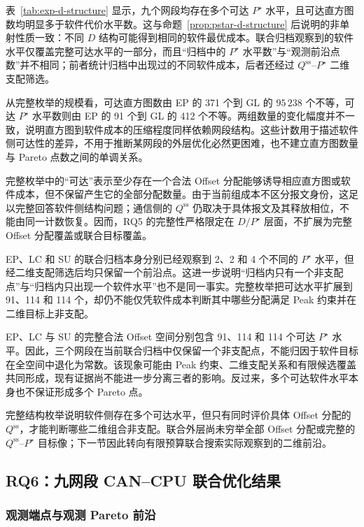 \documentclass[UTF8,a4paper,twoside,zihao=-4]{ctexart}
\numberwithin{equation}{section}
\numberwithin{figure}{section}
\numberwithin{table}{section}
\theoremstyle{definition}
\numberwithin{algocf}{section}
\begin{document}
表~\ref{tab:exp-d-structure} 显示，九个网段均存在多个可达 $P^\star$ 水平，且可达直方图数均明显多于软件代价水平数。这与命题~\ref{prop:pstar-d-structure} 后说明的非单射性质一致：不同 $D$ 结构可能得到相同的软件最优成本。联合归档观察到的软件水平仅覆盖完整可达水平的一部分，而且“归档中的 $P^\star$ 水平数”与“观测前沿点数”并不相同；前者统计归档中出现过的不同软件成本，后者还经过 $Q^{\mathrm{ss}}$--$P^\star$ 二维支配筛选。

从完整枚举的规模看，可达直方图数由 EP 的 371 个到 GL 的 $95\,238$ 个不等，可达 $P^\star$ 水平数则由 EP 的 91 个到 GL 的 412 个不等。两组数量的变化幅度并不一致，说明直方图到软件成本的压缩程度同样依赖网段结构。这些计数用于描述软件侧可达性的差异，不用于推断某网段的外层优化必然更困难，也不建立直方图数量与 Pareto 点数之间的单调关系。

完整枚举中的“可达”表示至少存在一个合法 Offset 分配能够诱导相应直方图或软件成本，但不保留产生它的全部分配数量。由于当前组成本不区分报文身份，这足以完整回答软件侧结构问题；通信侧的 $Q^{\mathrm{ss}}$ 仍取决于具体报文及其释放相位，不能由同一计数恢复。因而，RQ5 的完整性严格限定在 $D/P^\star$ 层面，不扩展为完整 Offset 分配覆盖或联合目标覆盖。

EP、LC 和 SU 的联合归档本身分别已经观察到 2、2 和 4 个不同的 $P^\star$ 水平，但经二维支配筛选后均只保留一个前沿点。这进一步说明“归档内只有一个非支配点”与“归档内只出现一个软件水平”也不是同一事实。完整枚举把可达水平扩展到 91、114 和 114 个，却仍不能仅凭软件成本判断其中哪些分配满足 Peak 约束并在二维目标上非支配。

EP、LC 与 SU 的完整合法 Offset 空间分别包含 91、114 和 114 个可达 $P^\star$ 水平。因此，三个网段在当前联合归档中仅保留一个非支配点，不能归因于软件目标在全空间中退化为常数。该现象可能由 Peak 约束、二维支配关系和有限候选覆盖共同形成，现有证据尚不能进一步分离三者的影响。反过来，多个可达软件水平本身也不保证形成多个 Pareto 点。

完整结构枚举说明软件侧存在多个可达水平，但只有同时评价具体 Offset 分配的 $Q^{\mathrm{ss}}$，才能判断哪些二维组合非支配。联合外层尚未穷举全部 Offset 分配或完整的 $Q^{\mathrm{ss}}$--$P^\star$ 目标像；下一节因此转向有限预算联合搜索实际观察到的二维前沿。

\FloatBarrier

\subsection{RQ6：九网段 CAN--CPU 联合优化结果}
\label{subsec:exp-rq6}

\subsubsection{观测端点与观测 Pareto 前沿}
\label{subsubsec:exp-rq6-fronts}
\end{document}
